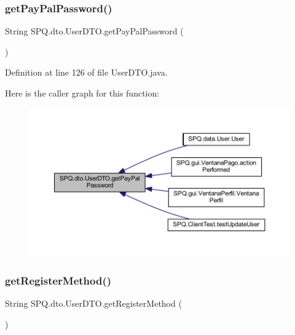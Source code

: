 \subsubsection{\texorpdfstring{get\+Pay\+Pal\+Password()}{getPayPalPassword()}}
{\footnotesize\ttfamily String S\+P\+Q.\+dto.\+User\+D\+T\+O.\+get\+Pay\+Pal\+Password (\begin{DoxyParamCaption}{ }\end{DoxyParamCaption})}



Definition at line 126 of file User\+D\+T\+O.\+java.

Here is the caller graph for this function\+:
\nopagebreak
\begin{figure}[H]
\begin{center}
\leavevmode
\includegraphics[width=350pt]{class_s_p_q_1_1dto_1_1_user_d_t_o_ab024e5157674f9bc382edfda06c348ec_icgraph}
\end{center}
\end{figure}
\mbox{\label{class_s_p_q_1_1dto_1_1_user_d_t_o_ab2180112e27f967d77dd4696f88bd2ef}} 
\subsubsection{\texorpdfstring{get\+Register\+Method()}{getRegisterMethod()}}
{\footnotesize\ttfamily String S\+P\+Q.\+dto.\+User\+D\+T\+O.\+get\+Register\+Method (\begin{DoxyParamCaption}{ }\end{DoxyParamCaption})}



